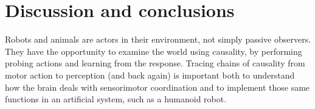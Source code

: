 
\section{Discussion and conclusions}

\ifnote

Robots and animals are actors in their environment, not simply passive
observers.  They have the opportunity to examine the world using
causality, by performing probing actions and learning from the
response.  Tracing chains of causality from motor action to perception
(and back again) is important both to understand how the brain deals
with sensorimotor coordination and to implement those same functions
in an artificial system, such as a humanoid robot.

\fi

